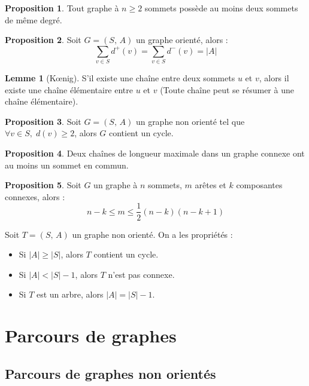 \documentclass[11pt,english,french]{scrreprt}
\theoremstyle{remark}
\theoremstyle{definition}
\newtheorem*{prop*}{Proposition}
\newtheorem*{lem*}{Lemme}
\begin{document}
\begin{prop*}
	Tout graphe à $n\geqslant 2$ sommets possède au moins deux sommets de même degré.
\end{prop*}

\begin{prop*}
	Soit $G=(S,\,A)$ un graphe orienté, alors :
	\begin{displaymath}
		\sum_{v\in S}d^+(v) = \sum_{v\in S}d^-(v)=|A|
	\end{displaymath}
\end{prop*}

\begin{lem*}[K\oe nig]
	S'il existe une chaîne entre deux sommets $u$ et $v$, alors il existe une chaîne élémentaire entre $u$ et $v$ (Toute chaîne peut se résumer à une chaîne élémentaire).
\end{lem*}

\begin{prop*}
	Soit $G=(S,\,A)$ un graphe non orienté tel que $\forall v\in S,\;d(v) \geqslant 2$, alors $G$ contient un cycle.
\end{prop*}

\begin{prop*}
	Deux chaînes de longueur maximale dans un graphe connexe ont au moins un sommet en commun.
\end{prop*}

\begin{prop*}
	Soit $G$ un graphe à $n$ sommets, $m$ arêtes et $k$ composantes connexes, alors :
	\begin{displaymath}
		n-k\leqslant m\leqslant \frac{1}{2}(n-k)(n-k+1)
	\end{displaymath}
\end{prop*}

Soit $T=(S,\,A)$ un graphe non orienté. On a les propriétés :\begin{itemize}
	\item Si $|A|\geqslant|S|$, alors $T$ contient un cycle.
	\item Si $|A| < |S|-1$, alors $T$ n'est pas connexe.
	\item Si $T$ est un arbre, alors $|A|=|S|-1$.
\end{itemize}

\chapter{Parcours de graphes} %

\section{Parcours de graphes non orientés} %
\end{document}
